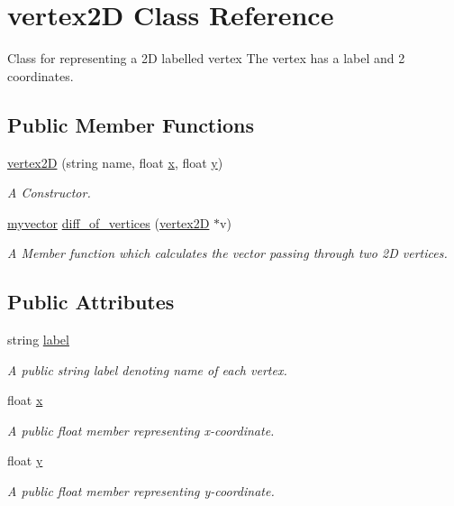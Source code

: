 \hypertarget{classvertex2D}{}\section{vertex2D Class Reference}
\label{classvertex2D}


Class for representing a 2D labelled vertex The vertex has a label and 2 coordinates.  


\subsection*{Public Member Functions}
\begin{DoxyCompactItemize}
\item 
\hyperlink{classvertex2D_a9f266c8c501d0349e35018d2ea66c56a}{vertex2D} (string name, float \hyperlink{classvertex2D_a2ba74d18c3e8e5a36fd2846a7a4d1a4f}{x}, float \hyperlink{classvertex2D_a6ca32b6427f8d3ce3437db0bafd92a00}{y})
\begin{DoxyCompactList}\small\item\em A Constructor. \end{DoxyCompactList}\item 
\hyperlink{classmyvector}{myvector} \hyperlink{classvertex2D_abf7a4ac8c177a3cc1b068a2df276a4cf}{diff\+\_\+of\+\_\+vertices} (\hyperlink{classvertex2D}{vertex2D} $\ast$v)
\begin{DoxyCompactList}\small\item\em A Member function which calculates the vector passing through two 2D vertices. \end{DoxyCompactList}\end{DoxyCompactItemize}
\subsection*{Public Attributes}
\begin{DoxyCompactItemize}
\item 
string \hyperlink{classvertex2D_a31103db4a64afce24d3d292f62ee3f3e}{label}
\begin{DoxyCompactList}\small\item\em A public string label denoting name of each vertex. \end{DoxyCompactList}\item 
float \hyperlink{classvertex2D_a2ba74d18c3e8e5a36fd2846a7a4d1a4f}{x}
\begin{DoxyCompactList}\small\item\em A public float member representing x-\/coordinate. \end{DoxyCompactList}\item 
float \hyperlink{classvertex2D_a6ca32b6427f8d3ce3437db0bafd92a00}{y}
\begin{DoxyCompactList}\small\item\em A public float member representing y-\/coordinate. \end{DoxyCompactList}\end{DoxyCompactItemize}


